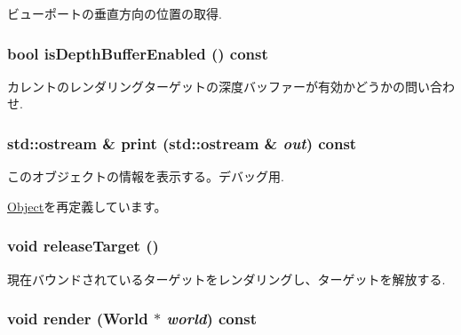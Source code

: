 ビューポートの垂直方向の位置の取得. \hypertarget{classm3g_1_1Graphics3D_7f17c6781152840d42e756c27b0fb8c8}{
\subsubsection[{isDepthBufferEnabled}]{\setlength{\rightskip}{0pt plus 5cm}bool isDepthBufferEnabled () const}}
\label{classm3g_1_1Graphics3D_7f17c6781152840d42e756c27b0fb8c8}


カレントのレンダリングターゲットの深度バッファーが有効かどうかの問い合わせ. \hypertarget{classm3g_1_1Graphics3D_6fea17fa1532df3794f8cb39cb4f911f}{
\subsubsection[{print}]{\setlength{\rightskip}{0pt plus 5cm}std::ostream \& print (std::ostream \& {\em out}) const}}
\label{classm3g_1_1Graphics3D_6fea17fa1532df3794f8cb39cb4f911f}


このオブジェクトの情報を表示する。デバッグ用. 

\hyperlink{classm3g_1_1Object_6fea17fa1532df3794f8cb39cb4f911f}{Object}を再定義しています。\hypertarget{classm3g_1_1Graphics3D_1491a435e97a20d5325339359a719cc5}{
\subsubsection[{releaseTarget}]{\setlength{\rightskip}{0pt plus 5cm}void releaseTarget ()}}
\label{classm3g_1_1Graphics3D_1491a435e97a20d5325339359a719cc5}


現在バウンドされているターゲットをレンダリングし、ターゲットを解放する. \hypertarget{classm3g_1_1Graphics3D_8ef004c92d601203b8c697d441e7713f}{
\subsubsection[{render}]{\setlength{\rightskip}{0pt plus 5cm}void render ({\bf World} $\ast$ {\em world}) const}}
\label{classm3g_1_1Graphics3D_8ef004c92d601203b8c697d441e7713f}


